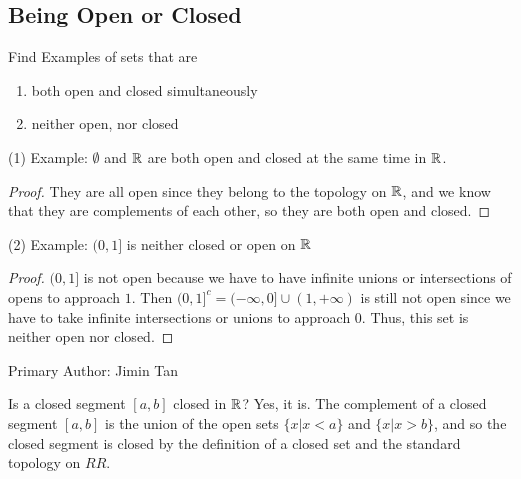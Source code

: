 \subsection{Being Open or Closed}
\begin{majorEx} %
  Find Examples of sets that are 
  \begin{enumerate}
  \item both open and closed simultaneously
  \item neither open, nor closed
  \end{enumerate}
\end{majorEx}

(1) Example: $\emptyset$ and $\mathbb{R}$ are both open and closed at the same time in $\mathbb{R}$.
\begin{proof}
They are all open since they belong to the topology on $\mathbb{R}$, and we know that they are complements of each other, so they are both open and closed.
\end{proof}

(2) Example: $(0, 1]$ is neither closed or open on $\mathbb{R}$
\begin{proof}
$(0, 1]$ is not open because we have to have infinite unions or intersections of opens to approach $1$. Then $(0, 1]^c = (-\infty, 0] \cup (1, +\infty)$ is still not open since we have to take infinite intersections or unions to approach $0$. Thus, this set is neither open nor closed.
\end{proof}

Primary Author: Jimin Tan

\begin{minorEx} %
\end{minorEx}

\begin{majorEx} %
Is a closed segment $[a, b]$ closed in $\mathbb{R}$?
Yes, it is. The complement of a closed segment $[a, b]$ is the union of the open sets $\{x | x < a\}$ and $\{x | x > b\}$, and so the closed segment is closed by the definition of a closed set and the standard topology on $RR$.
\end{majorEx}

